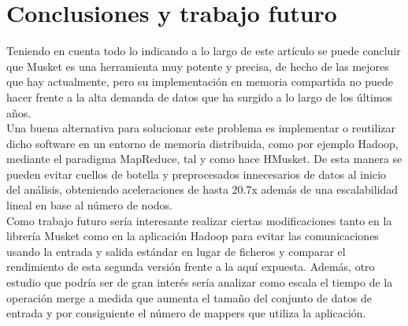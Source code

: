 \documentclass[conference]{IEEEtran}
\begin{document}
\section{Conclusiones y trabajo futuro}
Teniendo en cuenta todo lo indicando a lo largo de este artículo se puede concluir que Musket es una herramienta muy potente y precisa, de hecho de las mejores que hay actualmente, pero su implementación en memoria compartida no puede hacer frente a la alta demanda de datos que ha surgido a lo largo de los últimos años.\\
Una buena alternativa para solucionar este problema es implementar o reutilizar dicho software en un entorno de memoria distribuida, como por ejemplo Hadoop, mediante el paradigma MapReduce, tal y como hace HMusket. De esta manera se pueden evitar cuellos de botella y preprocesados innecesarios de datos al inicio del análisis, obteniendo aceleraciones de hasta 20.7x además de una escalabilidad lineal en base al número de nodos.\\ 

Como trabajo futuro sería interesante realizar ciertas modificaciones tanto en la librería Musket como en la aplicación Hadoop para evitar las comunicaciones usando la entrada y salida estándar en lugar de ficheros y comparar el rendimiento de esta segunda versión frente a la aquí expuesta. Además, otro estudio que podría ser de gran interés sería analizar como escala el tiempo de la operación merge a medida que aumenta el tamaño del conjunto de datos de entrada y por consiguiente el número de mappers que utiliza la aplicación.\\




\end{document}
